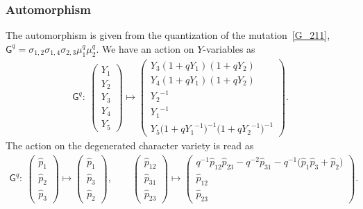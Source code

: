 \documentclass[pdftex]{sigma}
\numberwithin{equation}{section}
\begin{document}
\subsubsection*{Automorphism}
The automorphism is given from the quantization of the mutation~\eqref{G_211}, $\mathsf{G}^q=\sigma_{1,2} \sigma_{1,4} \sigma_{2,3}\mu^q_1 \mu^q_2$. We have an action on $Y$-variables as
\begin{gather*}
 \mathsf{G}^q \colon \
 \begin{pmatrix}
 Y_1 \\ Y_2 \\ Y_3 \\ Y_4 \\ Y_5
 \end{pmatrix}
 \mapsto
 \begin{pmatrix}
 Y_3 ( 1 + q Y_1 ) ( 1 + q Y_2 ) \\
 Y_4 ( 1 + q Y_1 ) ( 1 + q Y_2 ) \\
 {Y_2}^{-1} \\
 {Y_1}^{-1} \\
 Y_5 \big( 1 + q {Y_1}^{-1} \big)^{-1} \big( 1 + q {Y_2}^{-1} \big)^{-1}
 \end{pmatrix} .
\end{gather*}
The action on the degenerated character variety is read as
\begin{gather*}
 \mathsf{G}^q\colon \
 \begin{pmatrix}
 \hat{p}_1 \\ \hat{p}_2 \\ \hat{p}_3
 \end{pmatrix}
 \mapsto
 \begin{pmatrix}
 \hat{p}_1 \\ \hat{p}_3 \\ \hat{p}_2
 \end{pmatrix} , \qquad
 \begin{pmatrix}
 \hat{p}_{12} \\
 \hat{p}_{31} \\
 \hat{p}_{23}
 \end{pmatrix}
 \mapsto
 \begin{pmatrix}
 q^{-1} \hat{p}_{12} \hat{p}_{23} - q^{-2} \hat{p}_{31} - q^{-1} \big( \hat{p}_1 \hat{p}_3 + \hat{p}_2 \big) \\
 \hat{p}_{12} \\
 \hat{p}_{23}
 \end{pmatrix} .
\end{gather*}
\end{document}
